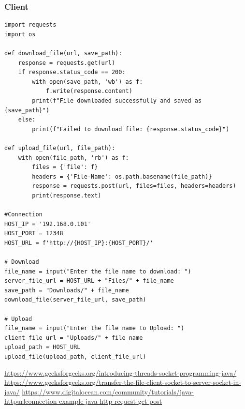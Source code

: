 \documentclass[11pt]{article}
\begin{document}
\subsubsection*{Client}
\begin{verbatim}
import requests
import os

def download_file(url, save_path):
    response = requests.get(url)
    if response.status_code == 200:
        with open(save_path, 'wb') as f:
            f.write(response.content)
        print(f"File downloaded successfully and saved as {save_path}")
    else:
        print(f"Failed to download file: {response.status_code}")

def upload_file(url, file_path):
    with open(file_path, 'rb') as f:
        files = {'file': f}
        headers = {'File-Name': os.path.basename(file_path)}
        response = requests.post(url, files=files, headers=headers)
        print(response.text)

#Connection
HOST_IP = '192.168.0.101'
HOST_PORT = 12348
HOST_URL = f'http://{HOST_IP}:{HOST_PORT}/'

# Download
file_name = input("Enter the file name to download: ")
server_file_url = HOST_URL + "Files/" + file_name
save_path = "Downloads/" + file_name
download_file(server_file_url, save_path)

# Upload
file_name = input("Enter the file name to Upload: ")
client_file_url = "Uploads/" + file_name
upload_path = HOST_URL
upload_file(upload_path, client_file_url)
\end{verbatim}


\begin{thebibliography}{1}
     \url{https://www.geeksforgeeks.org/introducing-threads-socket-programming-java/}
     \url{https://www.geeksforgeeks.org/transfer-the-file-client-socket-to-server-socket-in-java/}
     \url{https://www.digitalocean.com/community/tutorials/java-httpurlconnection-example-java-http-request-get-post}
\end{thebibliography}
\end{document}
